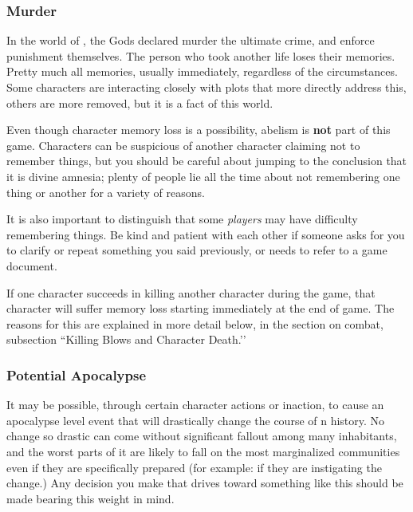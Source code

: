 \documentclass[sheet]{GL2020}
\begin{document}
\subsubsection{Murder}
In the world of \pEarth{}, the Gods declared murder the ultimate crime, and enforce punishment themselves. The person who took another life loses their memories. Pretty much all memories, usually immediately, regardless of the circumstances. Some characters are interacting closely with plots that more directly address this, others are more removed, but it is a fact of this world. 

Even though character memory loss is a possibility, abelism is \textbf{not} part of this game. Characters can be suspicious of another character claiming not to remember things, but you should be careful about jumping to the conclusion that it is divine amnesia; plenty of people lie all the time about not remembering one thing or another for a variety of reasons. 

It is also important to distinguish that some \emph{players} may have difficulty remembering things. Be kind and patient with each other if someone asks for you to clarify or repeat something you said previously, or needs to refer to a game document.

If one character succeeds in killing another character during the game, that character will suffer memory loss starting immediately at the end of game. The reasons for this are explained in more detail below, in the section on combat, subsection ``Killing Blows and Character Death.’’

\subsubsection{Potential Apocalypse}
It may be possible, through certain character actions or inaction, to cause an apocalypse level event that will drastically change the course of \pEarth{}n history. No change so drastic can come without significant fallout among many inhabitants, and the worst parts of it are likely to fall on the most marginalized communities even if they are specifically prepared (for example: if they are instigating the change.) Any decision you make that drives toward something like this should be made bearing this weight in mind.
\end{document}
